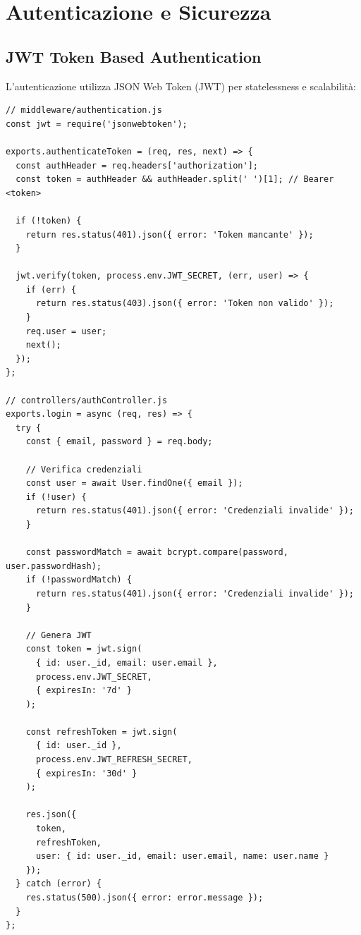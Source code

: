 \documentclass[12pt,a4paper]{report}
\begin{document}
\newpage

\chapter{Autenticazione e Sicurezza}

\section{JWT Token Based Authentication}

L'autenticazione utilizza JSON Web Token (JWT) per statelessness e scalabilità:

\begin{lstlisting}
// middleware/authentication.js
const jwt = require('jsonwebtoken');

exports.authenticateToken = (req, res, next) => {
  const authHeader = req.headers['authorization'];
  const token = authHeader && authHeader.split(' ')[1]; // Bearer <token>
  
  if (!token) {
    return res.status(401).json({ error: 'Token mancante' });
  }
  
  jwt.verify(token, process.env.JWT_SECRET, (err, user) => {
    if (err) {
      return res.status(403).json({ error: 'Token non valido' });
    }
    req.user = user;
    next();
  });
};

// controllers/authController.js
exports.login = async (req, res) => {
  try {
    const { email, password } = req.body;
    
    // Verifica credenziali
    const user = await User.findOne({ email });
    if (!user) {
      return res.status(401).json({ error: 'Credenziali invalide' });
    }
    
    const passwordMatch = await bcrypt.compare(password, user.passwordHash);
    if (!passwordMatch) {
      return res.status(401).json({ error: 'Credenziali invalide' });
    }
    
    // Genera JWT
    const token = jwt.sign(
      { id: user._id, email: user.email },
      process.env.JWT_SECRET,
      { expiresIn: '7d' }
    );
    
    const refreshToken = jwt.sign(
      { id: user._id },
      process.env.JWT_REFRESH_SECRET,
      { expiresIn: '30d' }
    );
    
    res.json({
      token,
      refreshToken,
      user: { id: user._id, email: user.email, name: user.name }
    });
  } catch (error) {
    res.status(500).json({ error: error.message });
  }
};
\end{lstlisting}
\end{document}
